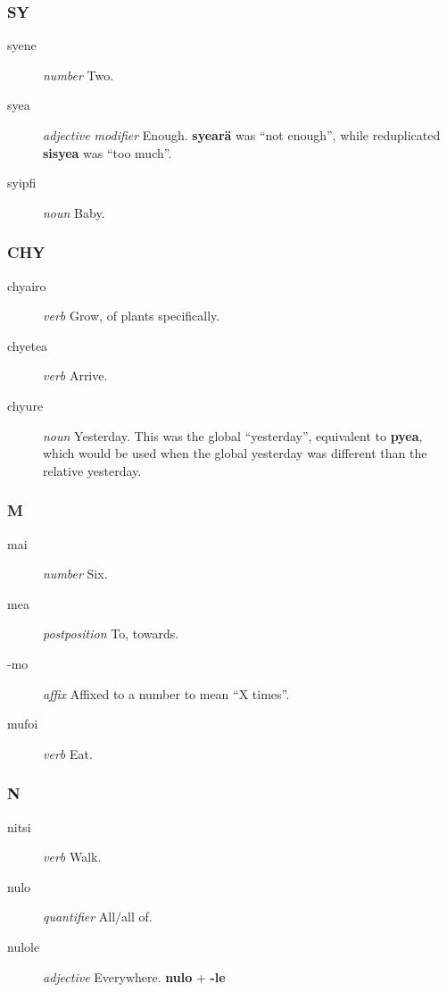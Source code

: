 \documentclass{article}
\begin{document}
\subsubsection{SY}

\begin{description}
\item [syene] \emph{number} Two.
\item [syea] \emph{adjective modifier} Enough.  \textbf{syear\"a} was ``not enough'', while reduplicated \textbf{sisyea} was ``too much''.
\item [syipfi] \emph{noun} Baby.
\end{description}

\subsubsection{CHY}

\begin{description}
\item [chyairo] \emph{verb} Grow, of plants specifically.
\item [chyetea] \emph{verb} Arrive.
\item [chyure] \emph{noun} Yesterday.  This was the global ``yesterday'', equivalent to \textbf{pyea}, which would be used when the global yesterday was different than the relative yesterday.
\end{description}

\subsubsection{M}

\begin{description}
\item [mai] \emph{number} Six.
\item [mea] \emph{postposition} To, towards.
\item [-mo] \emph{affix} Affixed to a number to mean ``X times''.
\item [mufoi] \emph{verb} Eat.
\end{description}

\subsubsection{N}

\begin{description}
\item [nitsi] \emph{verb} Walk.
\item [nulo] \emph{quantifier} All/all of.
\item [nulole] \emph{adjective} Everywhere. \textbf{nulo} + \textbf{-le}
\end{description}
\end{document}
